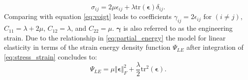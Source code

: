 \documentclass[m,times]{cgMA}
\begin{document}
\begin{equation} \label{eq:stress_strain}
  \sigma_{ij} = 2\mu \epsilon_{ij} + \lambda \text{tr}(\boldsymbol{\epsilon}) \delta_{ij}.
\end{equation}
Comparing with equation \ref{eq:voigt} leads to coefficients $\gamma_{ij} = 2\epsilon_{ij} \text{ for } (i \neq j)$, $C_{11} = \lambda +2 \mu$, $C_{12} = \lambda$, and $C_{22} = \mu$. $\boldsymbol{\gamma}$ is also referred to as the engineering strain. Due to the relationship in \ref{eq:partial_energy} the model for linear elasticity in terms of the strain energy density function $\Psi_{LE}$ after integration of \ref{eq:stress_strain} concludes to:
\begin{equation}\label{eq:linear_elas}
  \Psi_{LE} = \mu \Vert \boldsymbol{\epsilon} \Vert^2_F + \frac{\lambda}{2} \text{tr}^2(\boldsymbol{\epsilon}).
\end{equation}
\begin{flushright}\cite{MIT:LINEAR_ELASTICITY}\end{flushright}
\end{document}
